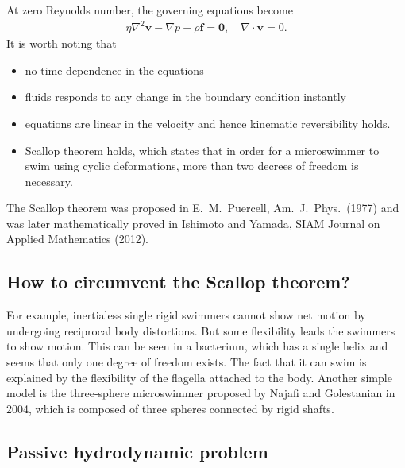 At zero Reynolds number, the governing equations become
\begin{align}
    \eta\nabla^2\mathbf{v}-\nabla p +\rho\mathbf{f}=\mathbf{0}, \quad
    \nabla\cdot\mathbf{v}=0.
\end{align}
It is worth noting that 
\begin{itemize}
    \item no time dependence in the equations
    \item fluids responds to any change in the boundary condition instantly
    \item equations are linear in the velocity and hence kinematic reversibility holds.
    \item Scallop theorem holds, which states that in order for a microswimmer to swim using cyclic deformations, more than two decrees of freedom is necessary.
\end{itemize}
The Scallop theorem was proposed in E.\ M.\ Puercell, Am.\ J.\ Phys.\ (1977) and was later mathematically proved in Ishimoto and Yamada, SIAM Journal on Applied Mathematics (2012).


\subsection{How to circumvent the Scallop theorem?}

For example, inertialess single rigid swimmers cannot show net motion by undergoing reciprocal body distortions. But some flexibility leads the swimmers to show motion. This can be seen in a bacterium, which has a single helix and seems that only one degree of freedom exists. 
The fact that it can swim is explained by the flexibility of the flagella attached to the body. Another simple model is the three-sphere microswimmer proposed by Najafi and Golestanian in 2004, which is composed of three spheres connected by rigid shafts.


\subsection{Passive hydrodynamic problem}

